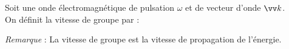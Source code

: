 ﻿\documentclass[a4paper]{article}
\begin{document}
\pagestyle{fancy}
\fancyhf{}
\setlength{\headheight}{15pt}

\begin{center}
	\large{}
\end{center}


Soit une onde électromagnétique de pulsation $\omega$ et de vecteur d'onde $\vv k$.\\
On définit la vitesse de groupe par : 
\par

\textit{Remarque} : La vitesse de groupe est la vitesse de propagation de l'énergie.
\end{document}
